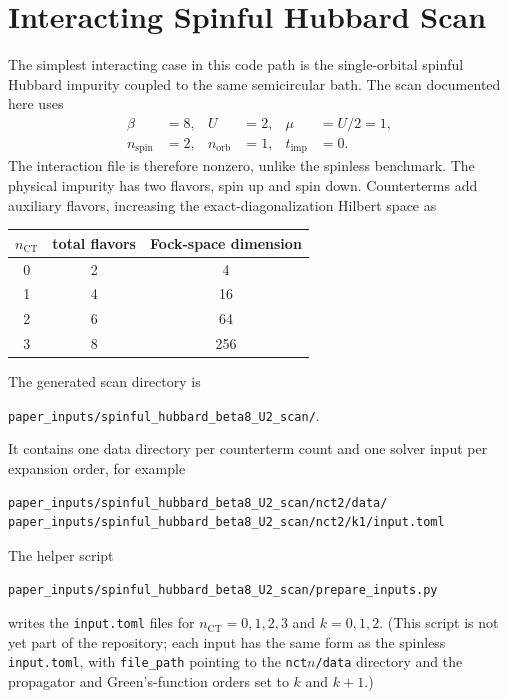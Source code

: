 \documentclass[11pt,a4paper]{article}
\theoremstyle{definition}
\theoremstyle{plain}
\begin{document}
\section{Interacting Spinful Hubbard Scan}

The simplest interacting case in this code path is the single-orbital spinful
Hubbard impurity coupled to the same semicircular bath.  The scan documented
here uses
\begin{align*}
  \beta &= 8, & U &= 2, & \mu &= U/2 = 1,\\
  n_{\mathrm{spin}} &= 2, & n_{\mathrm{orb}} &= 1, & t_{\mathrm{imp}} &= 0.
\end{align*}
The interaction file is therefore nonzero, unlike the spinless benchmark.  The
physical impurity has two flavors, spin up and spin down.  Counterterms add
auxiliary flavors, increasing the exact-diagonalization Hilbert space as
\begin{center}
\begin{tabular}{ccc}
\toprule
$n_{\mathrm{CT}}$ & total flavors & Fock-space dimension \\
\midrule
0 & 2 & 4 \\
1 & 4 & 16 \\
2 & 6 & 64 \\
3 & 8 & 256 \\
\bottomrule
\end{tabular}
\end{center}

The generated scan directory is
\begin{center}
\texttt{paper\_inputs/spinful\_hubbard\_beta8\_U2\_scan/}.
\end{center}
It contains one data directory per counterterm count and one solver input per
expansion order, for example
\begin{verbatim}
paper_inputs/spinful_hubbard_beta8_U2_scan/nct2/data/
paper_inputs/spinful_hubbard_beta8_U2_scan/nct2/k1/input.toml
\end{verbatim}
The helper script
\begin{center}
\texttt{paper\_inputs/spinful\_hubbard\_beta8\_U2\_scan/prepare\_inputs.py}
\end{center}
writes the \texttt{input.toml} files for $n_{\mathrm{CT}}=0,1,2,3$ and
$k=0,1,2$.  (This script is not yet part of the repository; each input has the
same form as the spinless \texttt{input.toml}, with \texttt{file\_path} pointing
to the \texttt{nct}$n$\texttt{/data} directory and the propagator and
Green's-function orders set to $k$ and $k+1$.)
\end{document}
